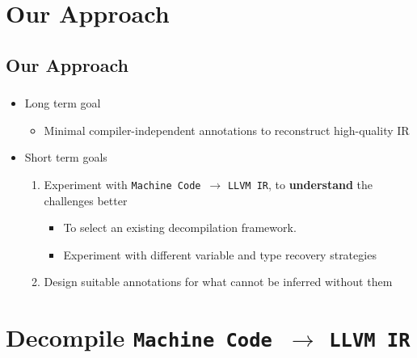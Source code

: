 \documentclass[mathserif,10pt]{beamer}
\newcommand{\cmt}[1]{}
\newcommand{\LIR}{{\tt LLVM IR}}
\newcommand{\MC}{{\tt Machine Code}}
\begin{document}
\section{Our Approach}
  \subsection*{Our Approach}
  \frame
  {
    \frametitle{\subsecname}
    \begin{itemize}
      \item Long term goal
        \begin{itemize}
          \item Minimal compiler-independent annotations to reconstruct high-quality IR
        \end{itemize}    
      \item Short term goals
        \begin{enumerate}
          \item Experiment with \MC\ $\rightarrow$ \LIR, to \textbf{understand} the challenges better
            \begin{itemize}
              \item To select an existing decompilation framework.
              \item Experiment with different variable and type recovery strategies
            \end{itemize}    
          \item Design suitable annotations for what cannot be inferred without them
        \end{enumerate}    
    \end{itemize}

      \cmt{

** Note: "Ship LLVM IR with machine code" already exists!  But requires source code and an LLVM-based compiler
      }


  }


\section{Decompile \MC \ $\rightarrow$ \LIR}
\end{document}
